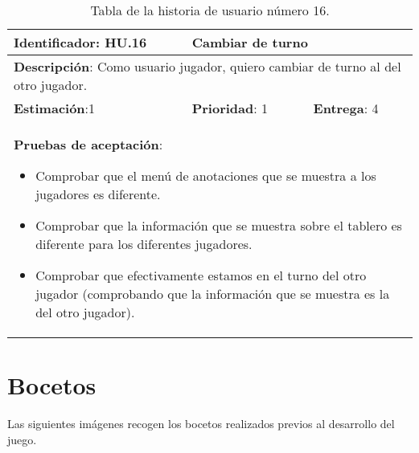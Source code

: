 \begin{table}[h]
  \begin{center}
    \begin{tabular}{|p{4cm}|p{4cm}|p{4cm}|}

    \hline
    \textbf{Identificador}: HU.16
    & \multicolumn{2}{p{8cm}|}{Cambiar de turno}\\

    \hline
    \multicolumn{3}{|p{12cm}|}{\textbf{Descripción}: Como usuario jugador, quiero cambiar de turno al del otro jugador.}\\

    \hline
    \textbf{Estimación}:1
    & \textbf{Prioridad}: 1
    & \textbf{Entrega}: 4\\

    \hline
    \multicolumn{3}{|p{12cm}|}{\textbf{Pruebas de aceptación}:
      \begin{itemize}
        \item Comprobar que el menú de anotaciones que se muestra a los jugadores es diferente.
        \item Comprobar que la información que se muestra sobre el tablero es diferente para los diferentes jugadores.
        \item Comprobar que efectivamente estamos en el turno del otro jugador (comprobando que la información que se muestra es la del otro jugador).
      \end{itemize}
    }\\

    \hline

    \end{tabular}

    \caption{Tabla de la historia de usuario número 16.}
    \label{tabla-hu16}

  \end{center}
\end{table}

\FloatBarrier


\section{Bocetos} \label{bocetos}

Las siguientes imágenes recogen los bocetos realizados previos al desarrollo del juego.\\

